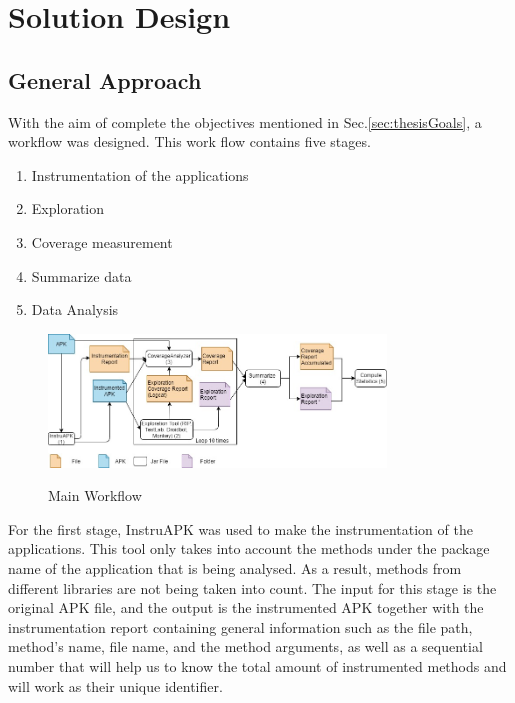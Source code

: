 
\chapter{Solution Design} %

\label{Chapter4} %

\section{General Approach} \label{sec:generalApproach}

With the aim of complete the objectives mentioned in Sec.\ref{sec:thesisGoals}, a workflow was designed. This work flow contains five stages.

\begin{enumerate}
	\item Instrumentation of the applications
	\item Exploration
	\item Coverage measurement
	\item Summarize data
	\item Data Analysis
\end{enumerate}

\begin{figure}[h]
\centering
\includegraphics[width=0.8\textwidth]{../Figures/workflow.jpg}
\label{fig:workflow}
\caption{Main Workflow}
\end{figure}



For the first stage, InstruAPK was used to make the instrumentation of the applications. This tool only takes into account the methods under the package name of the application that is being analysed. As a result, methods from different libraries are not being taken into count. The input for this stage is the original APK file, and the output is the instrumented APK together with the instrumentation report containing general information such as the file path, method's name, file name, and the method arguments, as well as a sequential number that will help us to know the total amount of instrumented methods and will work as their unique identifier.

